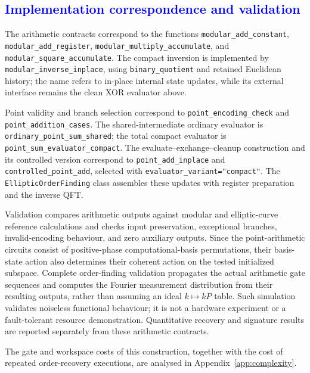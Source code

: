 \subsection{\textcolor{blue}{Implementation correspondence and validation}}
\begin{revision}
The arithmetic contracts correspond to the functions
\texttt{modular\_add\_constant},
\texttt{modular\_add\_register},
\texttt{modular\_multiply\_accumulate}, and
\texttt{modular\_square\_accumulate}.
The compact inversion is implemented by
\texttt{modular\_inverse\_inplace}, using
\texttt{binary\_quotient} and retained Euclidean history;
the name refers to in-place internal state updates, while its external
interface remains the clean XOR evaluator above.

Point validity and branch selection correspond to
\texttt{point\_encoding\_check} and
\texttt{point\_addition\_cases}.
The shared-intermediate ordinary evaluator is
\texttt{ordinary\_point\_sum\_shared}; the total compact evaluator is
\texttt{point\_sum\_evaluator\_compact}.
The evaluate--exchange--cleanup construction and its controlled
version correspond to \texttt{point\_add\_inplace} and
\texttt{controlled\_point\_add}, selected with
\texttt{evaluator\_variant="compact"}.
The \texttt{EllipticOrderFinding} class assembles these updates with
register preparation and the inverse QFT.

Validation compares arithmetic outputs against modular and
elliptic-curve reference calculations and checks input preservation,
exceptional branches, invalid-encoding behaviour, and zero auxiliary
outputs. Since the point-arithmetic circuits consist of positive-phase
computational-basis permutations, their basis-state action also
determines their coherent action on the tested initialized subspace.
Complete order-finding validation propagates the actual arithmetic
gate sequences and computes the Fourier measurement distribution
from their resulting outputs, rather than assuming an ideal
$k\mapsto kP$ table. Such simulation validates noiseless functional
behaviour; it is not a hardware experiment or a fault-tolerant resource
demonstration. Quantitative recovery and signature results are reported
separately from these arithmetic contracts.

The gate and workspace costs of this construction, together with the
cost of repeated order-recovery executions, are analysed in
Appendix~\ref{app:complexity}.
\end{revision}
